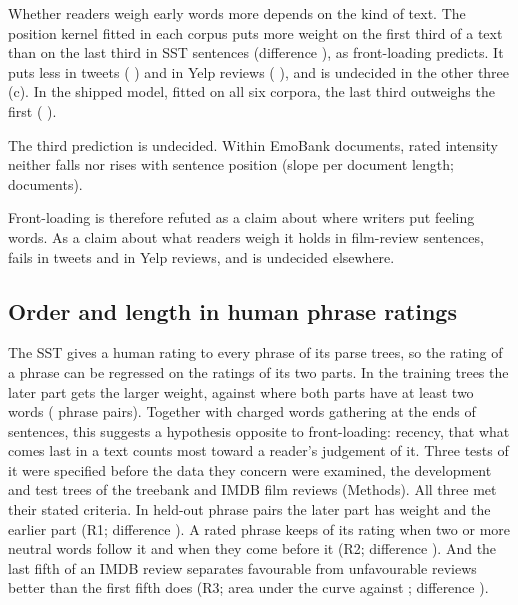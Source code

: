 Whether readers weigh early words more depends on the kind of text. The position kernel fitted in each corpus puts more weight on the first third of a text than on the last third in SST sentences (difference  ), as front-loading predicts. It puts less in tweets ( ) and in Yelp reviews ( ), and is undecided in the other three (c). In the shipped model, fitted on all six corpora, the last third outweighs the first (\constPos{} \constPosCI).

The third prediction is undecided. Within EmoBank documents, rated intensity neither falls nor rises with sentence position (slope \emoSlope{} \emoSlopeCI{} per document length; \emoDocs{} documents).

Front-loading is therefore refuted as a claim about where writers put feeling words. As a claim about what readers weigh it holds in film-review sentences, fails in tweets and in Yelp reviews, and is undecided elsewhere.

\figPosition

\subsection{Order and length in human phrase ratings}

The SST gives a human rating to every phrase of its parse trees\cite{socher2013}, so the rating of a phrase can be regressed on the ratings of its two parts. In the training trees the later part gets the larger weight, \wRightTwo{} against \wLeftTwo{} where both parts have at least two words (\ptNTrain{} phrase pairs). Together with charged words gathering at the ends of sentences, this suggests a hypothesis opposite to front-loading: recency, that what comes last in a text counts most toward a reader's judgement of it. Three tests of it were specified before the data they concern were examined, the development and test trees of the treebank and \confReviews{} IMDB film reviews\cite{maas2011} (Methods). All three met their stated criteria. In \confNodes{} held-out phrase pairs the later part has weight \confLater{} and the earlier part \confEarlier{} (R1; difference \confWeight{} \confWeightCI). A rated phrase keeps \confKeptAfter{} of its rating when two or more neutral words follow it and \confKeptBefore{} when they come before it (R2; difference \confKept{} \confKeptCI). And the last fifth of an IMDB review separates favourable from unfavourable reviews better than the first fifth does (R3; area under the curve \confAucLast{} against \confAucFirst; difference \confAuc{} \confAucCI).

